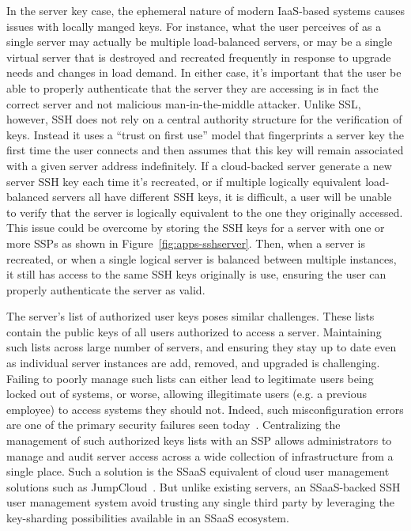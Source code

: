 In the server key case, the ephemeral nature of modern IaaS-based
systems causes issues with locally manged keys. For instance, what the
user perceives of as a single server may actually be multiple
load-balanced servers, or may be a single virtual server that is
destroyed and recreated frequently in response to upgrade needs and
changes in load demand. In either case, it's important that the user
be able to properly authenticate that the server they are accessing is
in fact the correct server and not malicious man-in-the-middle
attacker. Unlike SSL, however, SSH does not rely on a central
authority structure for the verification of keys. Instead it uses a
``trust on first use'' model that fingerprints a server key the first
time the user connects and then assumes that this key will remain
associated with a given server address indefinitely. If a cloud-backed
server generate a new server SSH key each time it's recreated, or if
multiple logically equivalent load-balanced servers all have different
SSH keys, it is difficult, a user will be unable to verify that the
server is logically equivalent to the one they originally
accessed. This issue could be overcome by storing the SSH keys for a
server with one or more SSPs as shown in
Figure~\ref{fig:apps-sshserver}. Then, when a server is recreated, or
when a single logical server is balanced between multiple instances,
it still has access to the same SSH keys originally is use, ensuring
the user can properly authenticate the server as valid.

The server's list of authorized user keys poses similar
challenges. These lists contain the public keys of all users
authorized to access a server. Maintaining such lists across large
number of servers, and ensuring they stay up to date even as
individual server instances are add, removed, and upgraded is
challenging. Failing to poorly manage such lists can either lead to
legitimate users being locked out of systems, or worse, allowing
illegitimate users (e.g. a previous employee) to access systems they
should not. Indeed, such misconfiguration errors are one of the
primary security failures seen today~\cite{bishop1996,
  kerravala2002}. Centralizing the management of such authorized keys
lists with an SSP allows administrators to manage and audit server
access across a wide collection of infrastructure from a single
place. Such a solution is the SSaaS equivalent of cloud user
management solutions such as JumpCloud~\cite{jumpcloud}. But unlike
existing servers, an SSaaS-backed SSH user management system avoid
trusting any single third party by leveraging the key-sharding
possibilities available in an SSaaS ecosystem.


